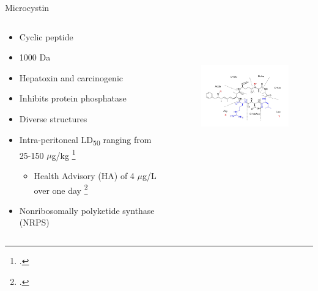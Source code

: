 \begin{frame}{Microcystin}

\begin{columns}
	\begin{column}{0.5\textwidth}

	\begin{itemize}
		\item Cyclic peptide
		\item 1000 Da
		\item Hepatoxin and carcinogenic
		\item Inhibits protein phosphatase
		\item Diverse structures 
		\item Intra-peritoneal LD\textsubscript{50} ranging from 25-150 $\mu$g/kg  \footcite{dittmann_cyanobacterial_2012}
			\begin{itemize}
				\item Health Advisory (HA) of 4 $\mu$g/L over one day \footcite{usepa_draft_2016}
			\end{itemize}
		\item Nonribosomally polyketide synthase (NRPS)
	\end{itemize}
	\end{column}
	\begin{column}{0.3\textwidth}
\begin{figure}[ht]
	\centering
	\hspace*{-9cm}
	\includegraphics[width=2.2in, height=2.2in]{../figures/Microcystin-LR.png}
\end{figure}
	\end{column}
\end{columns}

\end{frame}
